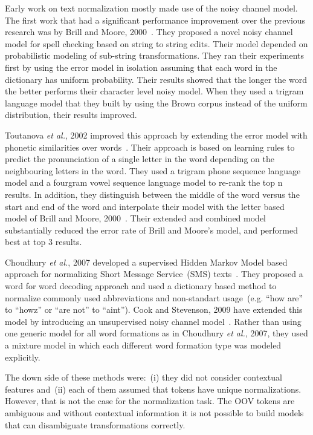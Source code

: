 \documentclass[a4paper,onesided,12pt]{report}
\begin{document}
Early work on text normalization mostly made use of the noisy channel model. The first work that had a significant performance improvement over the previous research was by Brill and Moore, 2000~\cite{Brill:2000:IEM:1075218.1075255}. They proposed a novel noisy channel model for spell checking based on string to string edits. Their model depended on probabilistic modeling of sub-string transformations. They ran their experiments first by using the error model in isolation assuming that each word in the dictionary has uniform probability. Their results showed that the longer the word the better performs their character level noisy model. When they used a trigram language model that they built by using the Brown corpus instead of the uniform distribution, their results improved.

Toutanova \textit{et al.}, 2002 improved this approach by extending the error model with phonetic similarities over words~\cite{Toutanova:2002:PMI:1073083.1073109}. Their approach is based on learning rules to predict the pronunciation of a single letter in the word depending on the neighbouring letters in the word. They used a trigram phone sequence language model and a fourgram vowel sequence language model to re-rank the top n results. In addition, they distinguish between the middle of the word versus the start and end of the word and interpolate their model with the letter based model of Brill and Moore, 2000~\cite{Brill:2000:IEM:1075218.1075255}. Their extended and combined model substantially reduced the error rate of Brill and Moore's model, and performed best at top 3 results.

Choudhury \textit{et al.}, 2007 developed a supervised Hidden Markov Model based approach for normalizing Short Message Service~(SMS) texts~\cite{Choudhury:2007:IMS:1326044.1326048}. They proposed a word for word decoding approach and used a dictionary based method to normalize commonly used abbreviations and non-standart usage~(e.g. ``how are'' to ``howz'' or ``are not'' to ``aint''). Cook and Stevenson, 2009 have extended this model by introducing an unsupervised noisy channel model~\cite{Cook:2009:UMT:1642011.1642021}. Rather than using one generic model for all word formations as in Choudhury \textit{et al.}, 2007, they used a mixture model in which each different word formation type was modeled explicitly.

The down side of these methods were:~(i) they did not consider contextual features and~(ii) each of them assumed that tokens have unique normalizations. However, that is not the case for the normalization task. The OOV tokens are ambiguous and without contextual information it is not possible to build models that can disambiguate transformations correctly.
\end{document}
